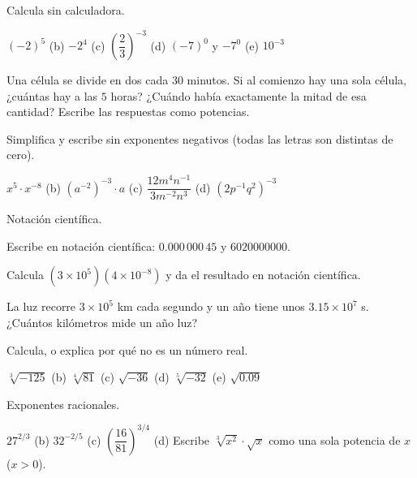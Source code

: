 \documentclass[11pt,a4paper]{article}
\begin{document}
\taller
\begin{ejercicios}
\item Calcula sin calculadora.
  \begin{ejercicios}
  \item $(-2)^{5}$ \quad (b) $-2^{4}$ \quad (c) $\left(\dfrac23\right)^{-3}$ \quad (d) $(-7)^{0}$ y $-7^{0}$ \quad (e) $10^{-3}$
  \end{ejercicios}
\item Una célula se divide en dos cada $30$ minutos. Si al comienzo hay una sola célula, ¿cuántas hay a las $5$ horas?
  ¿Cuándo había exactamente la mitad de esa cantidad? Escribe las respuestas como potencias.
\item Simplifica y escribe sin exponentes negativos (todas las letras son distintas de cero).
  \begin{ejercicios}
  \item $x^{5}\cdot x^{-8}$ \quad (b) $\left(a^{-2}\right)^{-3}\cdot a$ \quad (c) $\dfrac{12m^{4}n^{-1}}{3m^{-2}n^{3}}$
        \quad (d) $\left(2p^{-1}q^{2}\right)^{-3}$
  \end{ejercicios}
\item Notación científica.
  \begin{ejercicios}
  \item Escribe en notación científica: $0.000\,000\,45$ y $\num{6020000000}$.
  \item Calcula $\left(3\times10^{5}\right)\left(4\times10^{-8}\right)$ y da el resultado en notación científica.
  \item La luz recorre $3\times10^{5}$ km cada segundo y un año tiene unos $3.15\times10^{7}$ s. ¿Cuántos kilómetros mide
        un año luz?
  \end{ejercicios}
\item Calcula, o explica por qué no es un número real.
  \begin{ejercicios}
  \item $\sqrt[3]{-125}$ \quad (b) $\sqrt[4]{81}$ \quad (c) $\sqrt{-36}$ \quad (d) $\sqrt[5]{-32}$ \quad (e) $\sqrt{0.09}$
  \end{ejercicios}
\item Exponentes racionales.
  \begin{ejercicios}
  \item $27^{2/3}$ \quad (b) $32^{-2/5}$ \quad (c) $\left(\dfrac{16}{81}\right)^{3/4}$
        \quad (d) Escribe $\sqrt[3]{x^{2}}\cdot\sqrt{x}$ como una sola potencia de $x$ ($x>0$).
  \end{ejercicios}

\end{ejercicios}
\end{document}
